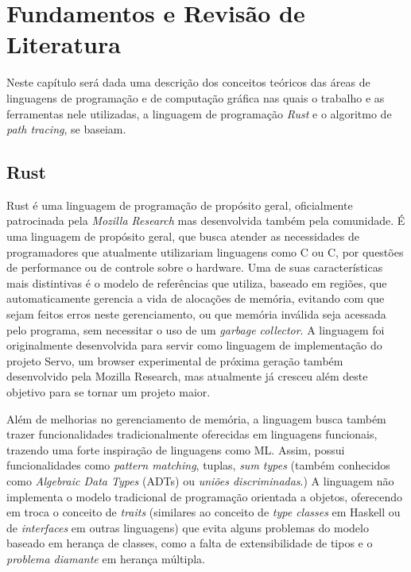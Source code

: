 \documentclass[tg]{mdtufsm}
\def\Cpp{{C\nolinebreak[4]\raisebox{.20ex}{\small\bf++}}}
\begin{document}
\chapter{Fundamentos e Revisão de Literatura}

Neste capítulo será dada uma descrição dos conceitos teóricos das áreas de linguagens de programação e de computação gráfica nas quais o trabalho e as ferramentas nele utilizadas, a linguagem de programação \emph{Rust} e o algoritmo de \emph{path tracing}, se baseiam.

\section{Rust}

Rust\citep{rust} é uma linguagem de programação de propósito geral, oficialmente patrocinada pela
\emph{Mozilla Research} mas desenvolvida também pela comunidade. É uma linguagem de propósito geral,
que busca atender as necessidades de programadores que atualmente utilizariam linguagens como C ou
\Cpp, por questões de performance ou de controle sobre o hardware. Uma de suas características mais
distintivas é o modelo de referências que utiliza, baseado em regiões\citep{tofte1997}, que
automaticamente gerencia a vida de alocações de memória, evitando com que sejam feitos erros neste
gerenciamento, ou que memória inválida seja acessada pelo programa, sem necessitar o uso de um
\emph{garbage collector}. A linguagem foi originalmente desenvolvida para servir como linguagem de
implementação do projeto Servo\citep{servo}, um browser experimental de próxima geração também
desenvolvido pela Mozilla Research, mas atualmente já cresceu além deste objetivo para se tornar um
projeto maior.

Além de melhorias no gerenciamento de memória, a linguagem busca também trazer funcionalidades
tradicionalmente oferecidas em linguagens funcionais, trazendo uma forte inspiração de linguagens
como ML\citep{milner1997}. Assim, possui funcionalidades como \emph{pattern matching}, tuplas,
\emph{sum types} (também conhecidos como \emph{Algebraic Data Types} (ADTs) ou \emph{uniões
discriminadas}.) A linguagem não implementa o modelo tradicional de programação orientada a objetos,
oferecendo em troca o conceito de \emph{traits} (similares ao conceito de \emph{type classes} em
Haskell ou de \emph{interfaces} em outras linguagens) que evita alguns problemas do modelo baseado
em herança de classes, como a falta de extensibilidade de tipos e o \emph{problema diamante} em
herança múltipla\citep{scharli2003}.
\end{document}
